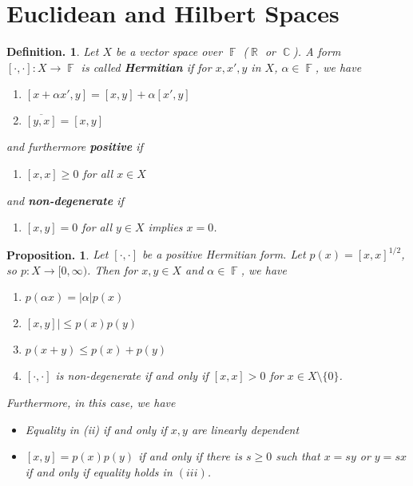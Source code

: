 \documentclass[11pt, a4paper]{memoir}
\DeclareMathOperator{\R}{{\mathbb{R}}}
\DeclareMathOperator{\C}{{\mathbb{C}}}
\DeclareMathOperator{\F}{{\mathbb{F}}}
\theoremstyle{change}
\newtheorem{proposition}[theorem]{Proposition.}
\theoremstyle{plain}
\theoremstyle{nonumberplain}
\newtheorem{definition}{Definition.}
\newcommand{\lbr}[1]{\ensuremath{\left[#1\right]}}
\numberwithin{equation}{section}
\begin{document}
\section{Euclidean and Hilbert Spaces}
\begin{definition}
    Let $X$ be a vector space over $\F$ ($\R$ or $\C$).
    A form $\lbr{\cdot,\cdot}:X\to\F$ is called \textbf{Hermitian} if for $x,x',y$ in $X$, $\alpha\in\F$, we have
    \begin{enumerate}[nl,r]
        \item $\lbr{x+\alpha x',y}=\lbr{x,y}+\alpha\lbr{x',y}$
        \item $\overline{\lbr{y,x}}=\lbr{x,y}$
    \end{enumerate}
    and furthermore \textbf{positive} if
    \begin{enumerate}[resume]
        \item $\lbr{x,x}\geq 0$ for all $x\in X$
    \end{enumerate}
    and \textbf{non-degenerate} if
    \begin{enumerate}[resume]
        \item $\lbr{x,y}=0$ for all $y\in X$ implies $x=0$.
    \end{enumerate}
\end{definition}
\begin{proposition}
    Let $[\cdot,\cdot]$ be a positive Hermitian form.
    Let $p(x)=\lbr{x,x}^{1/2}$, so $p:X\to[0,\infty)$.
    Then for $x,y\in X$ and $\alpha\in\F$, we have
    \begin{enumerate}[nl,r]
        \item $p(\alpha x)=|\alpha|p(x)$
        \item $\lbr{x,y}|\leq p(x)p(y)$
        \item $p(x+y)\leq p(x)+p(y)$
        \item $\lbr{\cdot,\cdot}$ is non-degenerate if and only if $\lbr{x,x}>0$ for $x\in X\setminus\{0\}$.
    \end{enumerate}
    Furthermore, in this case, we have
    \begin{itemize}[nl]
        \item Equality in (ii) if and only if $x,y$ are linearly dependent
        \item $\lbr{x,y}=p(x)p(y)$ if and only if there is $s\geq 0$ such that $x=sy$ or $y=sx$ if and only if equality holds in $(iii)$.
    \end{itemize}
\end{proposition}
\end{document}
